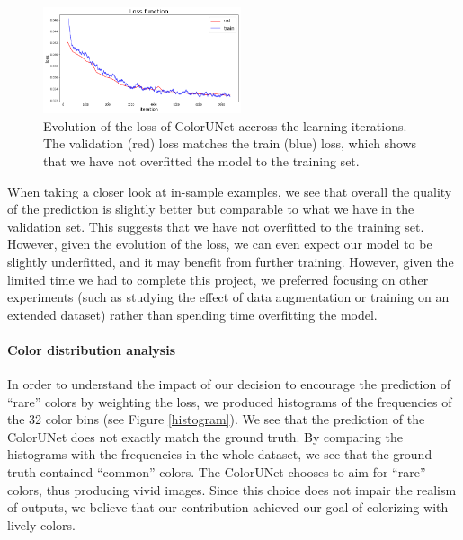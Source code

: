 \documentclass[10pt,twocolumn,letterpaper]{article}
\begin{document}
\begin{figure}
\begin{center}
\includegraphics[width=220px]{lossplot}
\caption{Evolution of the loss of ColorUNet accross the learning iterations. The validation (red) loss matches the train (blue) loss, which shows that we have not overfitted the model to the training set.}
\label{lossplot}
\end{center}
\end{figure}

When taking a closer look at in-sample examples, we see that overall the quality of the prediction is slightly better but comparable to what we have in the validation set. This suggests that we have not overfitted to the training set. However, given the evolution of the loss, we can even expect our model to be slightly underfitted, and it may benefit from further training. However, given the limited time we had to complete this project, we preferred focusing on other experiments (such as studying the effect of data augmentation or training on an extended dataset) rather than spending time overfitting the model.


\paragraph{Color distribution analysis}


In order to understand the impact of our decision to encourage the prediction of ``rare'' colors by weighting the loss, we produced histograms of the frequencies of the 32 color bins (see Figure \ref{histogram}). We see that the prediction of the ColorUNet does not exactly match the ground truth. By comparing the histograms with the frequencies in the whole dataset, we see that the ground truth contained ``common'' colors. The ColorUNet chooses to aim for ``rare'' colors, thus producing vivid images. Since this choice does not impair the realism of outputs, we believe that our contribution achieved our goal of colorizing with lively colors.
\end{document}
